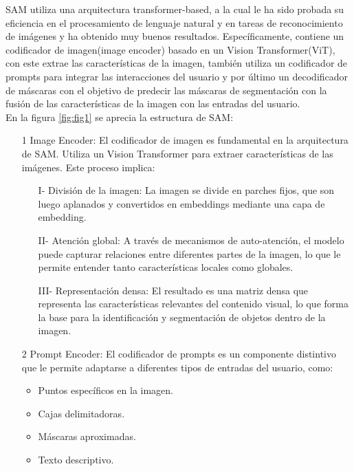 \documentclass[12pt]{article}
\begin{document}
		SAM utiliza una arquitectura transformer-based, a la cual le ha sido probada su eficiencia en el procesamiento de lenguaje natural y en tareas de reconocimiento de im\'agenes y ha obtenido muy buenos resultados. Espec\'ificamente, contiene un codificador de imagen(image encoder) basado en un Vision Transformer(ViT), con este extrae las caracter\'isticas de la imagen, tambi\'en utiliza un codificador de prompts para integrar las interacciones del usuario y por \'ultimo un decodificador de m\'ascaras con el objetivo de predecir las m\'ascaras de segmentaci\'on con la fusi\'on de las caracter\'isticas de la imagen con las entradas del usuario.
		\\
		
		En la figura \ref{fig:fig1} se aprecia la estructura de SAM:
		\begin{itemize}
			\item[1] Image Encoder: El codificador de imagen es fundamental en la arquitectura de SAM. Utiliza un Vision Transformer para extraer características de las imágenes. Este proceso implica:
			\begin{itemize}
				\item[I-]División de la imagen: La imagen se divide en parches fijos, que son luego aplanados y convertidos en embeddings mediante una capa de embedding.
				\item[II-]Atención global: A través de mecanismos de auto-atención, el modelo puede capturar relaciones entre diferentes partes de la imagen, lo que le permite entender tanto características locales como globales.
				\item[III-]Representación densa: El resultado es una matriz densa que representa las características relevantes del contenido visual, lo que forma la base para la identificación y segmentación de objetos dentro de la imagen.
			\end{itemize}
			
			
			\item[2] Prompt Encoder: El codificador de prompts es un componente distintivo que le permite  adaptarse a diferentes tipos de entradas del usuario, como:
			\begin{itemize}
				\item Puntos específicos en la imagen.
				\item Cajas delimitadoras.
				\item Máscaras aproximadas.
				\item Texto descriptivo.
			\end{itemize}
			

\end{itemize}
\end{document}
